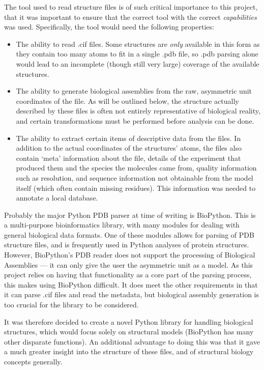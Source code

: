 The tool used to read structure files is of such critical importance to this project, that it was important to ensure that the correct tool with the correct \emph{capabilities} was used. Specifically, the tool would need the following properties:

\begin{itemize}
  \item The ability to read .cif files. Some structures are \emph{only} available in this form as they contain too many atoms to fit in a single .pdb file, so .pdb parsing alone would lead to an incomplete (though still very large) coverage of the available structures.
  \item The ability to generate biological assemblies from the raw, asymmetric unit coordinates of the file. As will be outlined below, the structure actually described by these files is often not entirely representative of biological reality, and certain transformations must be performed before analysis can be done.
  \item The ability to extract certain items of descriptive data from the files. In addition to the actual coordinates of the structures' atoms, the files also contain `meta' information about the file, details of the experiment that produced them and the species the molecules came from, quality information such as resolution, and sequence information not obtainable from the model itself (which often contain missing residues). This information was needed to annotate a local database.
\end{itemize}

Probably the major Python PDB parser at time of writing is BioPython. This is a multi-purpose bioinformatics library, with many modules for dealing with general biological data formats. One of these modules allows for parsing of PDB structure files, and is frequently used in Python analyses of protein structures. However, BioPython's PDB reader does not support the processing of Biological Assemblies --- it can only give the user the asymmetric unit as a model. As this project relies on having that functionality as a core part of the parsing process, this makes using BioPython difficult. It does meet the other requirements in that it can parse .cif files and read the metadata, but biological assembly generation is too crucial for the library to be considered.

It was therefore decided to create a novel Python library for handling biological structures, which would focus solely on structural models (BioPython has many other disparate functions). An additional advantage to doing this was that it gave a much greater insight into the structure of these files, and of structural biology concepts generally.

